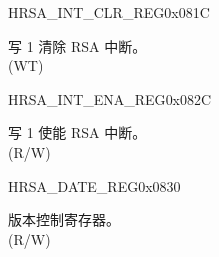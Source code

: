 \begin{register}{H}{RSA\_INT\_CLR\_REG}{0x081C}\label{regdesc:RSAINTCLRREG}
%
%
\regnewline%
\begin{regdesc}\begin{reglist}
\label{fielddesc:RSACLEARINTERRUPT}\item [RSA\_CLEAR\_INTERRUPT] 写 1 清除 RSA 中断。\\
(WT)
\end{reglist}\end{regdesc}
\end{register}


\begin{register}{H}{RSA\_INT\_ENA\_REG}{0x082C}\label{regdesc:RSAINTENAREG}
%
%
\regnewline%
\begin{regdesc}\begin{reglist}
\label{fielddesc:RSAINTENA}\item [RSA\_INT\_ENA] 写 1 使能 RSA 中断。\\
(R/W)
\end{reglist}\end{regdesc}
\end{register}


\begin{register}{H}{RSA\_DATE\_REG}{0x0830}\label{regdesc:RSADATEREG}
%
%
\regnewline%
\begin{regdesc}\begin{reglist}
\label{fielddesc:RSADATE}\item [RSA\_DATE] 版本控制寄存器。\\
(R/W)
\end{reglist}\end{regdesc}
\end{register}


